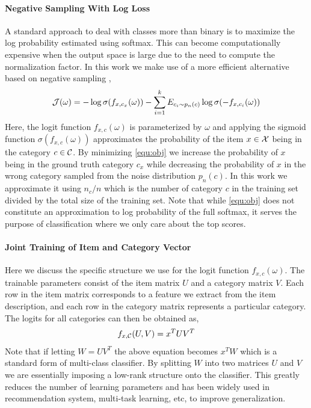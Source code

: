 \paragraph{Negative Sampling With Log Loss}
A standard approach to deal with classes more than binary is to maximize the log probability estimated using softmax. This can become computationally expensive when the output space is large due to the need to compute the normalization factor. In this work we make use of a more efficient alternative based on negative sampling \cite{mikolov2013distributed},
\begin{align}
\label{equ:obj}
    \mathcal{J}(\omega) = 
    - \log \sigma(f_{x, c_x}(\omega)) 
    - \sum_{i=1}^k E_{c_i \sim p_n(c)} \log \sigma(-f_{x, c_i}(\omega))
\end{align}
Here, the logit function $f_{x, c}(\omega)$ is parameterized by $\omega$ and applying the sigmoid function $\sigma(f_{x, c}(\omega))$ approximates the probability of the item $x \in \mathcal{X}$ being in the category $c \in \mathcal{C}$. 
By minimizing \eqref{equ:obj} we increase the probability of $x$ being in the ground truth category $c_x$ while decreasing the probability of $x$ in the wrong category sampled from the noise distribution $p_n(c)$. In this work we approximate it using $n_c / n$ which is the number of category $c$ in the training set divided by the total size of the training set. Note that while \eqref{equ:obj} does not constitute an approximation to log probability of the full softmax, it serves the purpose of classification where we only care about the top scores.

\paragraph{Joint Training of Item and Category Vector}
Here we discuss the specific structure we use for the logit function $f_{x, c}(\omega)$. The trainable parameters consist of the item matrix $U$ and a category matrix $V$. Each row in the item matrix corresponds to a feature we extract from the item description, and each row in the category matrix represents a particular category. The logits for all categories can then be obtained as,
\begin{align*}
    f_{x, \mathcal{C}}(U, V) = x^TUV^T
\end{align*}
Note that if letting $W = UV^T$ the above equation becomes $x^TW$ which is a standard form of multi-class classifier. By splitting $W$ into two matrices $U$ and $V$ we are essentially imposing a low-rank structure onto the classifier. This greatly reduces the number of learning parameters and has been widely used in recommendation system, multi-task learning, etc, to improve generalization.

